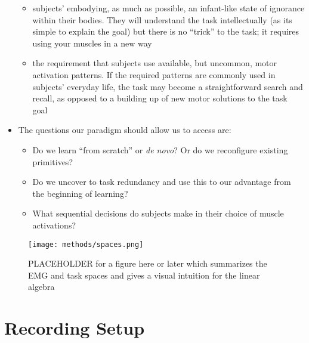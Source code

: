 \documentclass[../main.tex]{subfiles}
\begin{document}
\begin{itemize}
\begin{itemize}
    \item subjects' embodying, as much as possible, an infant-like state of ignorance within their bodies. They will understand the task intellectually (as its simple to explain the goal) but there is no ``trick'' to the task; it requires using your muscles in a new way
    \item the requirement that subjects use available, but uncommon, motor activation patterns. If the required patterns are commonly used in subjects' everyday life, the task may become a straightforward search and recall, as opposed to a building up of new motor solutions to the task goal
  \end{itemize}
  \item The questions our paradigm should allow us to access are:
  \begin{itemize}
    \item Do we learn ``from scratch'' or \textit{de novo}? Or do we reconfigure existing primitives?
    \item Do we uncover to task redundancy and use this to our advantage from the beginning of learning?
    \item What sequential decisions do subjects make in their choice of muscle activations?
  \end{itemize}
\end{itemize}


\begin{figure}[tph]
  \centering
  \texttt{[image: methods/spaces.png]}
  \caption[Geometry of the task]{PLACEHOLDER for a figure here or later which summarizes the EMG and task spaces and gives a visual intuition for the linear algebra}\label{fig:spaces}
\end{figure}


\section{Recording Setup}\label{sec:setup}
\end{document}
